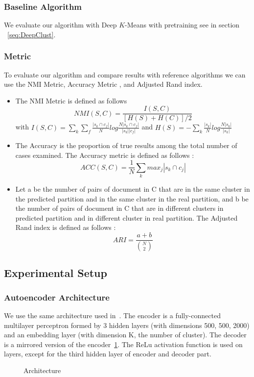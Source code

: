 \subsubsection{Baseline Algorithm}
We evaluate our algorithm with Deep $K$-Means with pretraining see in section
~\ref{seq:DeepClust}.
\subsubsection{Metric}
To evaluate our algorithm and compare results with reference algorithms we can
use the NMI Metric, Accuracy Metric \cite{NMI_ACC}, and Adjusted
Rand index\cite{ARI}. 
\begin{itemize}
\item The NMI Metric is defined as follows
$$NMI(S,C) = \frac{I(S,C)}{[H(S)+H(C)]/2}$$ 
with
$I(S,C) =\sum_k \sum_f\frac{|s_k \cap c_f|}{N}log\frac{N|s_k \cap c_f|}{|s_k| |c_f|}$
and
$H(S) = -\sum_k\frac{|s_k|}{N}log\frac{N|s_k|}{|s_k|}$
\item The Accuracy is the proportion of true results among the total
  number of cases examined. The Accuracy metric is defined as follows :
$$
ACC(S,C) = \frac{1}{N}\sum_k {max}_j|s_k \cap c_j|
$$
\item Let a be the number of pairs of document in C
  that are in the same cluster in the predicted partition and in the
  same cluster in the real partition, and b be the number of pairs of
  document in C that are in different clusters in predicted partition
  and in different cluster in real partition.
  The Adjusted Rand index is defined as follows :
  $$ARI = \frac{a+b}{\binom{N}{2}}$$
\end{itemize}
\subsection{Experimental Setup}
\subsubsection{Autoencoder Architecture}
We use the same architecture used in~\cite{Deap-K-Means}. The encoder is a fully-connected 
multilayer perceptron formed by 3 hidden layers (with dimensions 500, 500, 2000) 
and an embedding layer (with dimension K, the number of cluster). 
The decoder is a mirrored version of the encoder~\ref{fig:archi}.
The ReLu activation function is used on layers, except for the third
hidden layer of encoder and decoder part.
\begin{figure}[!h]
  \centering
  \caption{\label{fig:archi}Architecture}
\end{figure}
 
